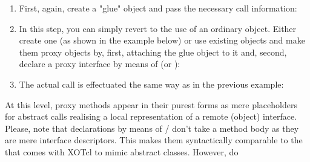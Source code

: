    \begin{enumerate}
    \item First, again, create a "glue" object and pass the necessary
      call information:
      \lstset{breaklines=true,numbers=left,basicstyle=\footnotesize,frame=single,tabsize=2}
      
    \item In this step, you can simply revert to the use of an
      ordinary object. Either create one (as shown in the example below) or
      use existing objects and make them proxy objects by, first, attaching
      the glue object to it and, second, declare a proxy interface by means
      of  (or
      ):
      
      
    \item The actual call is effectuated the same way as in the
      previous example:
      
    \end{enumerate}
    At this level, proxy methods appear in their purest forms as mere
    placeholders for abstract calls realising a local representation of a
    remote (object) interface. Please, note that declarations by means of
    /
     don't take a method
    body as they are mere interface descriptors. This makes them
    syntactically comparable to the  that comes with XOTcl to mimic abstract classes. However, do
